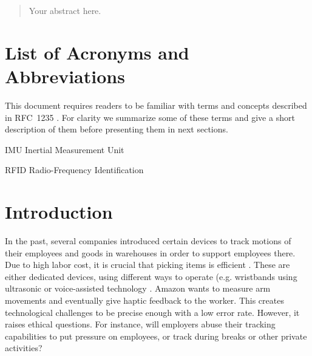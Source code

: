 \documentclass[12pt,twoside, hidelinks]{article}
\begin{document}
\maketitle


\begin{abstract}
\label{sec:abstract}

Your abstract here.

\end{abstract}

\tableofcontents

\section*{List of Acronyms and Abbreviations}
\label{list-of-acronyms-and-abbreviations}

This document requires readers to be familiar with terms and concepts described in \mbox{RFC~1235} \cite{john_ioannidis_coherent_1991}. For clarity we summarize some of these terms and give a short description of them before presenting them in next sections.

\begin{basedescript}{\desclabelstyle{\pushlabel}\desclabelwidth{10em}}
\item[IMU]					Inertial Measurement Unit
\item[RFID]					Radio-Frequency Identification
\end{basedescript}


\clearpage
\section{Introduction}
\label{sect:introduction}
In the past, several companies introduced certain devices to track motions of their employees and goods in warehouses in order to support employees there. Due to high labor cost, it is crucial that picking items is efficient \cite{frazelle2002}. These are either dedicated devices, using different ways to operate (e.g. wristbands using ultrasonic or voice-assisted technology \cite{bergerLudwig2007}. Amazon wants to measure arm movements and eventually give haptic feedback to the worker. This creates technological challenges to be precise enough with a low error rate. However, it raises ethical questions. For instance, will employers abuse their tracking capabilities to put pressure on employees, or track during breaks or other private activities?
\end{document}
